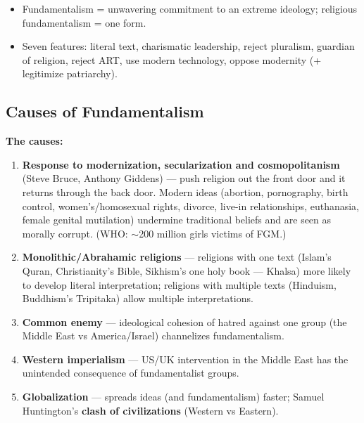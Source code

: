 \begin{QuickRevision}
\begin{itemize}
\item Fundamentalism = unwavering commitment to an extreme ideology; religious fundamentalism = one form.
\item Seven features: literal text, charismatic leadership, reject pluralism, guardian of religion, reject ART, use modern technology, oppose modernity (+ legitimize patriarchy).
\end{itemize}
\end{QuickRevision}

\sectiondivider

\subsection{Causes of Fundamentalism}

\begin{CriticalPoint}
\textbf{The causes:}
\begin{enumerate}
\item \textbf{Response to modernization, secularization and cosmopolitanism} (Steve Bruce, Anthony Giddens) --- push religion out the front door and it returns through the back door. Modern ideas (abortion, pornography, birth control, women's/homosexual rights, divorce, live-in relationships, euthanasia, female genital mutilation) undermine traditional beliefs and are seen as morally corrupt. (WHO: $\sim$200 million girls victims of FGM.)
\item \textbf{Monolithic/Abrahamic religions} --- religions with one text (Islam's Quran, Christianity's Bible, Sikhism's one holy book --- Khalsa) more likely to develop literal interpretation; religions with multiple texts (Hinduism, Buddhism's Tripitaka) allow multiple interpretations.
\item \textbf{Common enemy} --- ideological cohesion of hatred against one group (the Middle East vs America/Israel) channelizes fundamentalism.
\item \textbf{Western imperialism} --- US/UK intervention in the Middle East has the unintended consequence of fundamentalist groups.
\item \textbf{Globalization} --- spreads ideas (and fundamentalism) faster; Samuel Huntington's \textbf{clash of civilizations} (Western vs Eastern).
\end{enumerate}
\end{CriticalPoint}


